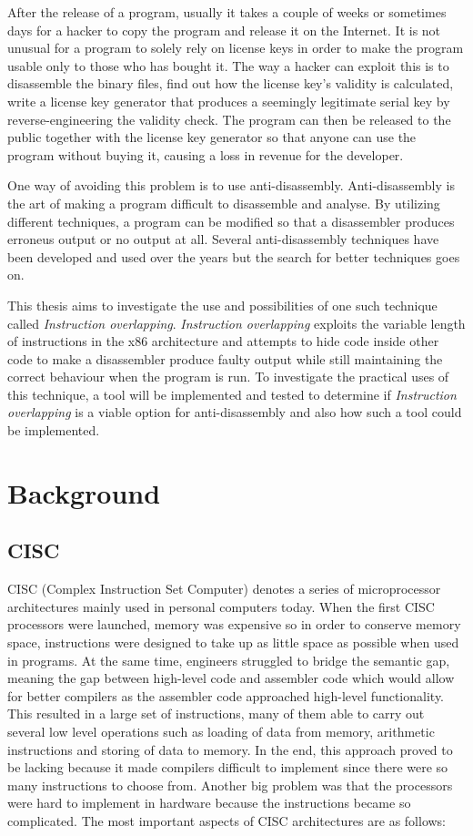\documentclass[11pt,twoside]{eitExjobb}
\begin{document}
After the release of a program, usually it takes a couple of weeks or sometimes days for a hacker to copy the program and release it on the Internet. It is not unusual for a program to solely rely on license keys in order to make the program usable only to those who has bought it. The way a hacker can exploit this is to disassemble the binary files, find out how the license key's validity is calculated, write a license key generator that produces a seemingly legitimate serial key by reverse-engineering the validity check. The program can then be released to the public together with the license key generator so that anyone can use the program without buying it, causing a loss in revenue for the developer.

One way of avoiding this problem is to use anti-disassembly. Anti-disassembly is the art of making a program difficult to disassemble and analyse. By utilizing different techniques, a program can be modified so that a disassembler produces erroneus output or no output at all. Several anti-disassembly techniques have been developed and used over the years but the search for better techniques goes on. 

This thesis aims to investigate the use and possibilities of one such technique called \emph{Instruction overlapping}. \emph{Instruction overlapping} exploits the variable length of instructions in the x86 architecture and attempts to hide code inside other code to make a disassembler produce faulty output  while still maintaining the correct behaviour when the program is run. To investigate the practical uses of this technique, a tool will be implemented and tested to determine if \emph{Instruction overlapping} is a viable option for anti-disassembly and also how such a tool could be implemented.


\chapter{Background}
\section{CISC}
CISC (Complex Instruction Set Computer) denotes a series of microprocessor architectures mainly used in personal computers today. When the first CISC processors were launched, memory was expensive so in order to conserve memory space, instructions were designed to take up as little space as possible when used in programs. At the same time, engineers struggled to bridge the semantic gap, meaning the gap between high-level code and assembler code which would allow for better compilers as the assembler code approached high-level functionality. This resulted in a large set of instructions, many of them able to carry out several low level operations such as loading of data from memory, arithmetic instructions and storing of data to memory. In the end, this approach proved to be lacking because it made compilers difficult to implement since there were so many instructions to choose from. Another big problem was that the processors were hard to implement in hardware because the instructions became so complicated. The most important aspects of CISC architectures are as follows:\cite{datorteknik}
\end{document}
